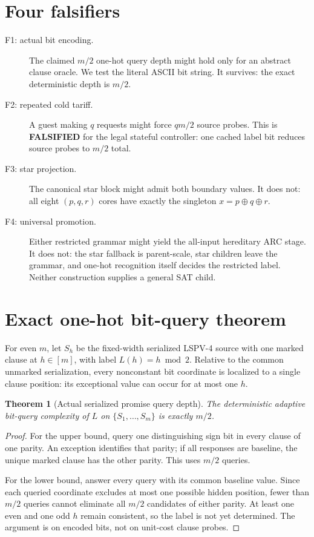 \documentclass[11pt]{article}
\newtheorem{theorem}{Theorem}
\begin{document}
\section{Four falsifiers}
\begin{description}
\item[F1: actual bit encoding.] The claimed $m/2$ one-hot query depth might
hold only for an abstract clause oracle.  We test the literal ASCII bit string.
It survives: the exact deterministic depth is $m/2$.
\item[F2: repeated cold tariff.] A guest making $q$ requests might force
$q m/2$ source probes.  This is \textbf{FALSIFIED} for the legal stateful
controller: one cached label bit reduces source probes to $m/2$ total.
\item[F3: star projection.] The canonical star block might admit both boundary
values.  It does not: all eight $(p,q,r)$ cores have exactly the singleton
$x=p\oplus q\oplus r$.
\item[F4: universal promotion.] Either restricted grammar might yield the
all-input hereditary ARC stage.  It does not: the star fallback is parent-scale,
star children leave the grammar, and one-hot recognition itself decides the
restricted label.  Neither construction supplies a general SAT child.
\end{description}

\section{Exact one-hot bit-query theorem}
For even $m$, let $S_h$ be the fixed-width serialized LSPV-4 source with one
marked clause at $h\in[m]$, with label $L(h)=h\bmod 2$.  Relative to the common
unmarked serialization, every nonconstant bit coordinate is localized to a
single clause position: its exceptional value can occur for at most one $h$.

\begin{theorem}[Actual serialized promise query depth]
The deterministic adaptive bit-query complexity of $L$ on
$\{S_1,\ldots,S_m\}$ is exactly $m/2$.
\end{theorem}
\begin{proof}
For the upper bound, query one distinguishing sign bit in every clause of one
parity.  An exception identifies that parity; if all responses are baseline,
the unique marked clause has the other parity.  This uses $m/2$ queries.

For the lower bound, answer every query with its common baseline value.  Since
each queried coordinate excludes at most one possible hidden position, fewer
than $m/2$ queries cannot eliminate all $m/2$ candidates of either parity.
At least one even and one odd $h$ remain consistent, so the label is not yet
determined.  The argument is on encoded bits, not on unit-cost clause probes.
\end{proof}
\end{document}
